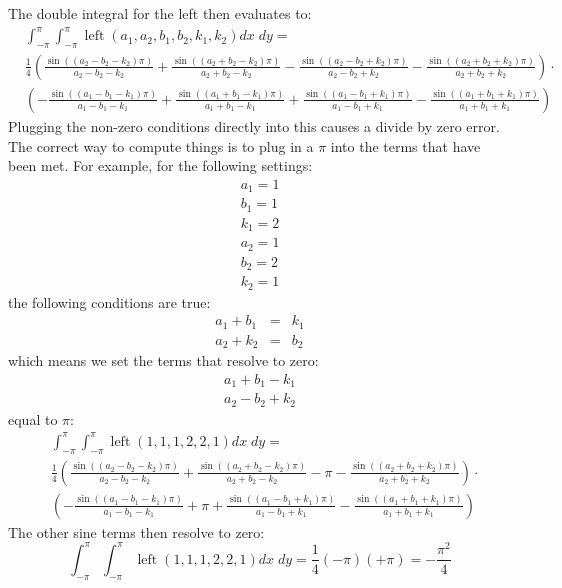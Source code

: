 \documentclass[12pt,onecolumn]{article}
\DeclareMathOperator{\Left}{left}
\begin{document}
The double integral for the left then evaluates to:
\begin{equation}
\begin{split}
&\int_{-\pi}^\pi\int_{-\pi}^\pi \Left(a_1, a_2, b_1, b_2, k_1, k_2) dx \; dy = \\
&\frac{1}{4}\left( 
\frac{\sin\left((a_2 - b_2 - k_2)\pi\right)}{a_2 - b_2 - k_2}
+ \frac{\sin\left((a_2 + b_2 - k_2)\pi\right)}{a_2 + b_2 - k_2}
- \frac{\sin\left((a_2 - b_2 + k_2)\pi\right)}{a_2 - b_2 + k_2}
- \frac{\sin\left((a_2 + b_2 + k_2)\pi\right)}{a_2 + b_2 + k_2}
\right) \cdot\\
&\left( 
-\frac{\sin\left((a_1 - b_1 - k_1)\pi\right)}{a_1 - b_1 - k_1}
+ \frac{\sin\left((a_1 + b_1 - k_1)\pi\right)}{a_1 + b_1 - k_1}
+ \frac{\sin\left((a_1 - b_1 + k_1)\pi\right)}{a_1 - b_1 + k_1}
- \frac{\sin\left((a_1 + b_1 + k_1)\pi\right)}{a_1 + b_1 + k_1}
\right)
\end{split}
\end{equation}
Plugging the non-zero conditions directly into this causes a divide by zero error. The correct way to compute things is to plug in a $\pi$ into the terms that have been met. For example, for the following settings:
\begin{eqnarray*}
a_1 = 1\\
b_1 = 1\\
k_1 = 2\\
a_2 = 1\\
b_2 = 2\\
k_2 = 1
\end{eqnarray*}
the following conditions are true:
\begin{eqnarray*}
a_1 + b_1 &=& k_1\\
a_2 + k_2 &=& b_2
\end{eqnarray*}
which means we set the terms that resolve to zero:
\begin{eqnarray*}
a_1 + b_1 - k_1\\
a_2 - b_2 + k_2
\end{eqnarray*}
equal to $\pi$:
\begin{equation}
\begin{split}
&\int_{-\pi}^\pi\int_{-\pi}^\pi \Left(1,1,1,2,2,1) dx \; dy = \\
&\frac{1}{4}\left( 
\frac{\sin\left((a_2 - b_2 - k_2)\pi\right)}{a_2 - b_2 - k_2}
+ \frac{\sin\left((a_2 + b_2 - k_2)\pi\right)}{a_2 + b_2 - k_2}
- \pi
- \frac{\sin\left((a_2 + b_2 + k_2)\pi\right)}{a_2 + b_2 + k_2}
\right) \cdot\\
&\left( 
-\frac{\sin\left((a_1 - b_1 - k_1)\pi\right)}{a_1 - b_1 - k_1}
+ \pi
+ \frac{\sin\left((a_1 - b_1 + k_1)\pi\right)}{a_1 - b_1 + k_1}
- \frac{\sin\left((a_1 + b_1 + k_1)\pi\right)}{a_1 + b_1 + k_1}
\right)
\end{split}
\end{equation}
The other sine terms then resolve to zero:
\begin{equation}
\int_{-\pi}^\pi\int_{-\pi}^\pi \Left(1,1,1,2,2,1) dx \; dy =
\frac{1}{4}\left( - \pi \right) \left( + \pi\right) = -\frac{\pi^2}{4}
\end{equation}
\end{document}
